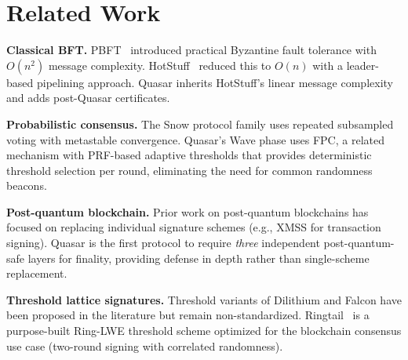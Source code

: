 \section{Related Work}

\label{sec:related}

\textbf{Classical BFT.}
PBFT~\cite{castro1999practical} introduced practical Byzantine fault tolerance
with $O(n^2)$ message complexity. HotStuff~\cite{yin2019hotstuff} reduced this
to $O(n)$ with a leader-based pipelining approach. Quasar inherits HotStuff's
linear message complexity and adds post-Quasar certificates.

\textbf{Probabilistic consensus.}
The Snow protocol family uses repeated subsampled voting with metastable
convergence. Quasar's Wave phase uses FPC, a related mechanism with
PRF-based adaptive thresholds that provides deterministic threshold selection
per round, eliminating the need for common randomness beacons.

\textbf{Post-quantum blockchain.}
Prior work on post-quantum blockchains has focused on replacing individual
signature schemes (e.g., XMSS for transaction signing). Quasar is the first
protocol to require \emph{three} independent post-quantum-safe layers for
finality, providing defense in depth rather than single-scheme replacement.

\textbf{Threshold lattice signatures.}
Threshold variants of Dilithium and Falcon have been proposed in the
literature but remain non-standardized. Ringtail~\cite{ringtail} is a
purpose-built Ring-LWE threshold scheme optimized for the blockchain consensus
use case (two-round signing with correlated randomness).


